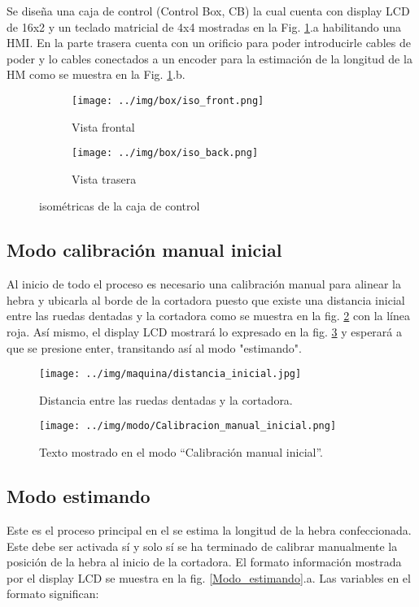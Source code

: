 \documentclass[main_conf.tex]{subfiles}
\begin{document}
Se diseña una caja de control (Control Box, CB) la cual cuenta
con display LCD de 16x2 y un teclado matricial de 4x4 mostradas
en la Fig. \ref{box:iso}.a habilitando una HMI. En la parte trasera
cuenta con un orificio para poder introducirle cables de poder y
lo cables conectados a un encoder para la estimación de la longitud
de la HM como se muestra en la Fig. \ref{box:iso}.b.

\begin{figure}[t]
  \centering
  \begin{subfigure}[b]{0.5\textwidth}
    \centering
    \texttt{[image: ../img/box/iso\_front.png]}
    \caption{Vista frontal}
  \end{subfigure}

  \begin{subfigure}[b]{0.5\textwidth}
    \centering
    \texttt{[image: ../img/box/iso\_back.png]}
    \caption{Vista trasera}
  \end{subfigure}

  \caption{isométricas de la caja de control}
  \label{box:iso}
\end{figure}


\subsection{Modo calibración manual inicial}
Al inicio de todo el proceso es necesario una calibración manual para
alinear la hebra y ubicarla al borde de la cortadora puesto que existe
una distancia inicial entre las ruedas dentadas y la cortadora como se
muestra en la fig. \ref{distancia_inicial} con la línea roja.
Así mismo, el display LCD mostrará lo expresado en la fig.
\ref{Modo_Calibracion_manual_inicial} y esperará a que se presione
enter, transitando así al modo "estimando".

\begin{figure}[!t]
  \centering
  \texttt{[image: ../img/maquina/distancia\_inicial.jpg]}
  \caption{Distancia entre las ruedas dentadas y la cortadora.}
  \label{distancia_inicial}
\end{figure}

\begin{figure}[!t]
  \centering
  \texttt{[image: ../img/modo/Calibracion\_manual\_inicial.png]}
  \caption{Texto mostrado en el modo “Calibración manual inicial”.}
  \label{Modo_Calibracion_manual_inicial}
\end{figure}

\subsection{Modo estimando}
Este es el proceso principal en el se estima la longitud de la hebra
confeccionada. Este debe ser activada sí y solo sí se ha terminado de
calibrar manualmente la posición de la hebra al inicio de la cortadora.
El formato información mostrada por el display LCD se muestra en la fig.
\ref{Modo_estimando}.a. Las variables en el formato significan:
\end{document}
